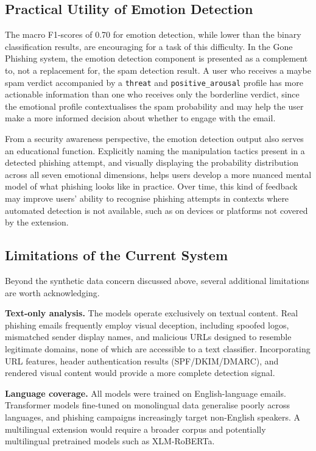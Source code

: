 \subsection{Practical Utility of Emotion Detection}

The macro F1-scores of 0.70 for emotion detection, while lower than the binary classification results, are encouraging for a task of this difficulty. In the Gone Phishing system, the emotion detection component is presented as a complement to, not a replacement for, the spam detection result. A user who receives a maybe spam verdict accompanied by a \texttt{threat} and \texttt{positive\_arousal} profile has more actionable information than one who receives only the borderline verdict, since the emotional profile contextualises the spam probability and may help the user make a more informed decision about whether to engage with the email.

From a security awareness perspective, the emotion detection output also serves an educational function. Explicitly naming the manipulation tactics present in a detected phishing attempt, and visually displaying the probability distribution across all seven emotional dimensions, helps users develop a more nuanced mental model of what phishing looks like in practice. Over time, this kind of feedback may improve users' ability to recognise phishing attempts in contexts where automated detection is not available, such as on devices or platforms not covered by the extension.

\subsection{Limitations of the Current System}

Beyond the synthetic data concern discussed above, several additional limitations are worth acknowledging.

\textbf{Text-only analysis.} The models operate exclusively on textual content. Real phishing emails frequently employ visual deception, including spoofed logos, mismatched sender display names, and malicious URLs designed to resemble legitimate domains, none of which are accessible to a text classifier. Incorporating URL features, header authentication results (SPF/DKIM/DMARC), and rendered visual content would provide a more complete detection signal.

\textbf{Language coverage.} All models were trained on English-language emails. Transformer models fine-tuned on monolingual data generalise poorly across languages, and phishing campaigns increasingly target non-English speakers. A multilingual extension would require a broader corpus and potentially multilingual pretrained models such as XLM-RoBERTa.

